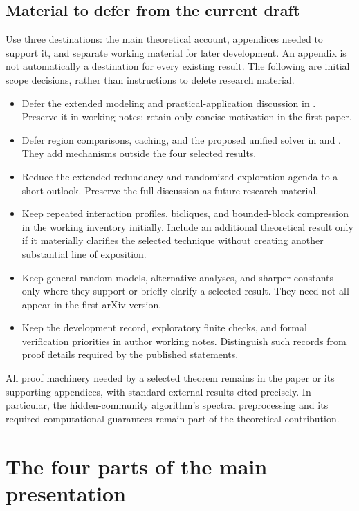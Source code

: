 \documentclass[11pt,a4paper]{article}
\newcommand{\draftlabel}[1]{\texttt{\detokenize{#1}}}
\begin{document}
\subsection{Material to defer from the current draft}

Use three destinations: the main theoretical account, appendices needed
to support it, and separate working material for later development.
An appendix is not automatically a destination for every existing result.
The following are initial scope decisions, rather than instructions to
delete research material.

\begin{itemize}
\item Defer the extended modeling and practical-application discussion
in \draftlabel{sec:applications}. Preserve it in working notes; retain
only concise motivation in the first paper.
\item Defer region comparisons, caching, and the proposed unified solver
in \draftlabel{sec:cache} and \draftlabel{sec:unified}. They add mechanisms
outside the four selected results.
\item Reduce the extended redundancy and randomized-exploration agenda
to a short outlook. Preserve the full discussion as future research
material.
\item Keep repeated interaction profiles, bicliques, and bounded-block
compression in the working inventory initially. Include an additional
theoretical result only if it materially clarifies the selected technique
without creating another substantial line of exposition.
\item Keep general random models, alternative analyses, and sharper
constants only where they support or briefly clarify a selected result.
They need not all appear in the first arXiv version.
\item Keep the development record, exploratory finite checks, and formal
verification priorities in author working notes. Distinguish such records
from proof details required by the published statements.
\end{itemize}

All proof machinery needed by a selected theorem remains in the paper or
its supporting appendices, with standard external results cited precisely.
In particular, the hidden-community algorithm's spectral preprocessing
and its required computational guarantees remain part of the theoretical
contribution.

\section{The four parts of the main presentation}
\end{document}
